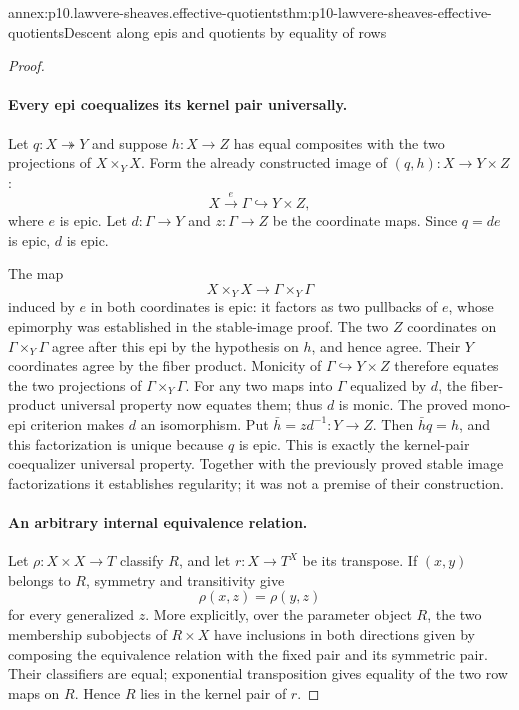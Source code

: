 \begin{annexitem}{annex:p10.lawvere-sheaves.effective-quotients}{thm:p10-lawvere-sheaves-effective-quotients}{Descent along epis and quotients by equality of rows}
\begin{proof}
\paragraph{Every epi coequalizes its kernel pair universally.}
Let \(q:X\twoheadrightarrow Y\) and suppose
\(h:X\to Z\) has equal composites with the two projections
of \(X\times_YX\).  Form the already constructed image
of \((q,h):X\to Y\times Z\):
\[
           X\xrightarrow{e}\Gamma\hookrightarrow Y\times Z,
\]
where \(e\) is epic.  Let \(d:\Gamma\to Y\) and
\(z:\Gamma\to Z\) be the coordinate maps.  Since
\(q=de\) is epic, \(d\) is epic.

The map
\[
             X\times_YX\longrightarrow\Gamma\times_Y\Gamma
\]
induced by \(e\) in both coordinates is epic: it factors
as two pullbacks of \(e\), whose epimorphy was established
in the stable-image proof.  The two \(Z\) coordinates on
\(\Gamma\times_Y\Gamma\) agree after this epi by the
hypothesis on \(h\), and hence agree.  Their \(Y\)
coordinates agree by the fiber product.  Monicity of
\(\Gamma\hookrightarrow Y\times Z\) therefore equates
the two projections of \(\Gamma\times_Y\Gamma\).
For any two maps into \(\Gamma\) equalized by \(d\),
the fiber-product universal property now equates them;
thus \(d\) is monic.  The proved mono-epi criterion makes
\(d\) an isomorphism.  Put \(\bar h=z d^{-1}:Y\to Z\).
Then \(\bar hq=h\), and this factorization is unique
because \(q\) is epic.  This is exactly the kernel-pair
coequalizer universal property.  Together with the
previously proved stable image factorizations it establishes
regularity; it was not a premise of their construction.

\paragraph{An arbitrary internal equivalence relation.}
Let \(\rho:X\times X\to T\) classify \(R\), and let
\(r:X\to T^X\) be its transpose.  If \((x,y)\) belongs
to \(R\), symmetry and transitivity give
\[
                         \rho(x,z)=\rho(y,z)
\]
for every generalized \(z\).  More explicitly, over the
parameter object \(R\), the two membership subobjects of
\(R\times X\) have inclusions in both directions given
by composing the equivalence relation with the fixed pair
and its symmetric pair.  Their classifiers are equal;
exponential transposition gives equality of the two row
maps on \(R\).  Hence \(R\) lies in the kernel pair
of \(r\).


\end{proof}
\end{annexitem}
